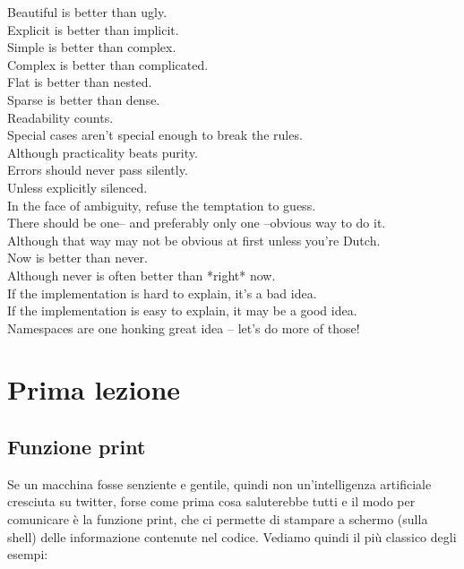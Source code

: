 \documentclass[10pt,a4paper]{article}
\begin{document}
\noindent Beautiful is better than ugly.\\
Explicit is better than implicit.\\
Simple is better than complex.\\
Complex is better than complicated.\\
Flat is better than nested.\\
Sparse is better than dense.\\
Readability counts.\\
Special cases aren't special enough to break the rules.\\
Although practicality beats purity.\\
Errors should never pass silently.\\
Unless explicitly silenced.\\
In the face of ambiguity, refuse the temptation to guess.\\
There should be one-- and preferably only one --obvious way to do it.\\
Although that way may not be obvious at first unless you're Dutch.\\
Now is better than never.\\
Although never is often better than *right* now.\\
If the implementation is hard to explain, it's a bad idea.\\
If the implementation is easy to explain, it may be a good idea.\\
Namespaces are one honking great idea -- let's do more of those!\\


\section{Prima lezione}

\subsection{Funzione print}
Se un macchina fosse senziente e gentile, quindi non un'intelligenza artificiale cresciuta su twitter, forse come prima cosa saluterebbe tutti e il modo per comunicare è la funzione print, che ci permette di stampare a schermo (sulla shell) delle informazione contenute nel codice. Vediamo quindi il più classico degli esempi:
\end{document}
